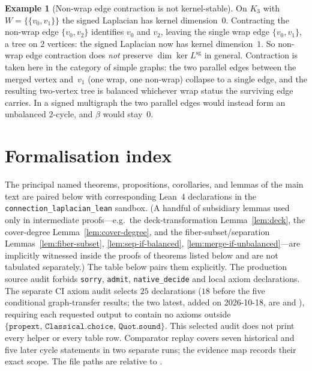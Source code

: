 \documentclass[11pt,a4paper]{amsart}
\theoremstyle{plain}
\theoremstyle{definition}
\newtheorem{example}[theorem]{Example}
\theoremstyle{remark}
\DeclareMathOperator{\Ker}{ker}
\newcommand{\Lsigned}{L^{\operatorname{sg}}}
\begin{document}
\begin{example}[Non-wrap edge contraction is not kernel-stable]
\label{ex:contraction}
On $K_3$ with $W=\{\{v_0,v_1\}\}$ the signed Laplacian has
kernel dimension~$0$. Contracting the non-wrap edge $\{v_0,v_2\}$
identifies $v_0$ and $v_2$, leaving the single wrap edge
$\{v_0,v_1\}$, a tree on $2$ vertices: the signed Laplacian
now has kernel dimension~$1$. So non-wrap edge contraction does
\emph{not} preserve $\dim\Ker\Lsigned$ in general. Contraction is taken
here in the category of simple graphs: the two parallel edges between
the merged vertex and~$v_1$ (one wrap, one non-wrap) collapse to a
single edge, and the resulting two-vertex tree is balanced whichever
wrap status the surviving edge carries. In a signed multigraph the two
parallel edges would instead form an unbalanced $2$-cycle, and $\beta$
would stay~$0$.
\end{example}

\appendix
\section{Formalisation index}\label{app:formal-index}

The principal named theorems, propositions, corollaries, and
lemmas of the main text are paired below with corresponding
Lean~4 declarations in the
\texttt{connection\_laplacian\_lean} sandbox. (A handful of
subsidiary lemmas used only in intermediate proofs---e.g.\ the
deck-transformation Lemma~\ref{lem:deck}, the cover-degree
Lemma~\ref{lem:cover-degree}, and the fiber-subset/separation
Lemmas~\ref{lem:fiber-subset}, \ref{lem:sep-if-balanced},
\ref{lem:merge-if-unbalanced}---are implicitly witnessed inside
the proofs of theorems listed below and are not tabulated
separately.) The table below
pairs them explicitly. The production source audit forbids
\texttt{sorry}, \texttt{admit}, \texttt{native\_decide} and local axiom
declarations. The separate CI axiom audit selects $25$ declarations
($18$ before the five conditional graph-transfer results; the two
latest, added on 2026-10-18, are
 and
), requiring
each requested output to contain no axioms outside
$\{\texttt{propext},\, \texttt{Classical.choice},\, \texttt{Quot.sound}\}$.
This selected audit does not print every helper or every table row.
Comparator replay covers seven historical and five later cycle statements
in two separate runs; the evidence map records their exact scope. The file
paths are relative to
.
\end{document}

